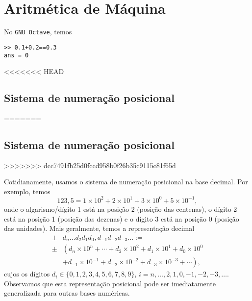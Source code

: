 
\chapter{Aritmética de Máquina}\label{cap_aritm}
\thispagestyle{fancy}

\ifisoctave
No \verb+GNU Octave+, temos
\begin{verbatim}
>> 0.1+0.2==0.3
ans = 0
\end{verbatim}
\fi

<<<<<<< HEAD
\section{Sistema de numeração posicional}\label{cap_aritm_sec_sisnumpos}
=======
\section{Sistema de numeração posicional}\label{cap_artm_sec_sisnumpos}
>>>>>>> dcc7491fb25d0fccd958b0f26b35c9115c81f65d

Cotidianamente, usamos o sistema de numeração posicional na base decimal. Por exemplo, temos
\begin{equation}
  123,5 = 1\times 10^2 + 2\times 10^1 + 3\times 10^0 + 5\times 10^{-1},
\end{equation}
onde o algarismo/dígito 1 está na posição 2 (posição das centenas), o dígito 2 está na posição 1 (posição das dezenas) e o dígito 3 está na posição 0 (posição das unidades). Mais geralmente, temos a representação decimal
\begin{align}
  \pm &d_n\ldots d_2d_1d_0,d_{-1}d_{-2}d_{-3}\ldots := \\
  \pm &\left(d_n\times 10^n + \cdots + d_2\times 10^2 + d_1\times 10^1 + d_0\times 10^0\right. \\
      &\left. + d_{-1}\times 10^{-1} + d_{-2}\times 10^{-2} + d_{-3}\times 10^{-3} + \cdots\right),
\end{align}
cujos os dígitos $d_i \in \{0, 1, 2, 3, 4, 5, 6, 7, 8, 9\}$, $i=n, \dotsc, 2, 1, 0, -1, -2, -3, \ldots$. Observamos que esta representação posicional pode ser imediatamente generalizada para outras bases numéricas.


